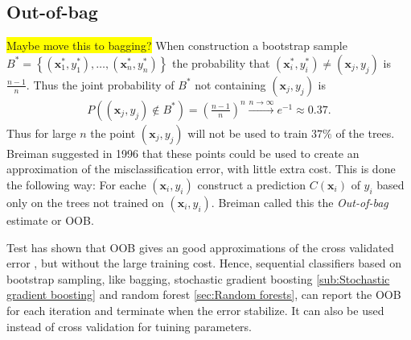 \subsection{Out-of-bag}
\label{sub:Out-of-bag}
\colorbox{yellow}{Maybe move this to bagging?}
When construction a bootstrap sample $B^* = \left\{ (\mathbf{x}_1^*, y_1^*), \ldots, (\mathbf{x}_n^*, y_n^*) \right\}$ the probability that $(\mathbf{x}_i^*, y_i^*) \neq (\mathbf{x}_j, y_j)$ is $\frac{n-1}{n}$. Thus the joint probability of $B^*$ not containing $(\mathbf{x}_j, y_j)$ is 
\begin{align}
  P\left(  (\mathbf{x}_j, y_j) \notin B^*\right) = \left( \frac{n-1}{n}  \right)^n 
  \xrightarrow{n \rightarrow \infty} e^{-1} \approx 0.37. 
\end{align}
Thus for large $n$ the point $(\mathbf{x}_j, y_j)$ will not be used to train $37 \%$ of the trees. Breiman suggested in 1996 \cite{outOfBag} that these points could be used to create an approximation of the misclassification error, with little extra cost. This is done the following way: For eache $(\mathbf{x}_i, y_i)$ construct a prediction $C(\mathbf{x}_i)$ of $y_i$ based only on the trees not trained on $(\mathbf{x}_i, y_i)$. Breiman called this the \textit{Out-of-bag} estimate or OOB. 

Test has shown that OOB gives an good approximations of the cross validated error \cite{outOfBag}, but without the large training cost. 
Hence, sequential classifiers based on bootstrap sampling, like bagging, stochastic gradient boosting \ref{sub:Stochastic gradient boosting} and random forest \ref{sec:Random forests}, can report the OOB for each iteration and terminate when the error stabilize. It can also be used instead of cross validation for tuining parameters.








